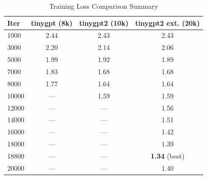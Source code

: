 \documentclass[conference]{IEEEtran}
\begin{document}
\begin{table}[h]
\centering
\caption{Training Loss Comparison Summary}
\label{tab:loss8k10ksummary}
\begin{tabular}{lccc}
\toprule
Iter & tinygpt (8k) & tinygpt2 (10k) & tinygpt2 ext. (20k) \\
\midrule
1000 & 2.44 & 2.43 & 2.43 \\
3000 & 2.20 & 2.14 & 2.06 \\
5000 & 1.99 & 1.92 & 1.89 \\
7000 & 1.83 & 1.68 & 1.68 \\
8000 & 1.77 & 1.64 & 1.64 \\
10000 & --- & 1.59 & 1.59 \\
12000 & --- & --- & 1.56 \\
14000 & --- & --- & 1.51 \\
16000 & --- & --- & 1.42 \\
18000 & --- & --- & 1.39 \\
18800 & --- & --- & \textbf{1.34} (best) \\
20000 & --- & --- & 1.40 \\
\bottomrule
\end{tabular}
\end{table}
\end{document}
